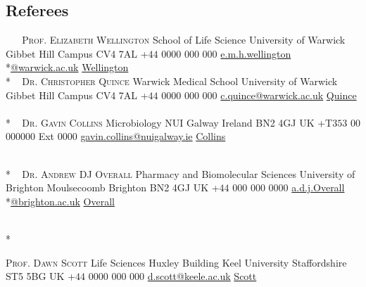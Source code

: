 \documentclass[hidelinks]{james-cv} %
\begin{document}
\begin{aside1}
\color{gray}\headingfontcontact
\section{Referees}
~
~
\normalsize\color{gray}\bodyfontsc\textsc{Prof. Elizabeth Wellington}
\bodyfontcontact\normalsize
School of Life Science
University of Warwick
Gibbet Hill Campus
CV4 7AL
+$44$ $0000$ $000$ $000$ \Phone
\footnotesize\mail\href{mailto:e.m.h.wellington@warwick.ac.uk}{e.m.h.wellington}\\*\href{mailto:e.m.h.wellington@warwick.ac.uk}{@warwick.ac.uk} \Envelope
\color{blue}\href{https://warwick.ac.uk/fac/sci/lifesci/research/wrg/} {Wellington}
~
\\*
~
\color{gray}\normalsize\bodyfontsc\textsc{Dr. Christopher Quince}
\bodyfontcontact\normalsize
Warwick Medical School
University of Warwick
Gibbet Hill Campus
CV4 7AL
+$44$ $0000$ $000$ $000$ \Phone
\footnotesize\mail\href{mailto:c.quince@warwick.ac.uk}{c.quince@warwick.ac.uk} \Envelope 
\color{blue}\href{https://warwick.ac.uk/fac/sci/med/staff/cquince/}{Quince}
~
\\*
~
\color{gray}\normalsize\bodyfontsc\textsc{Dr. Gavin Collins}
\bodyfontcontact\normalsize
Microbiology
NUI Galway
Ireland
BN2 4GJ
UK
+T$353$ $00$ $000000$ Ext $0000$ \Phone
\footnotesize\mail\href{mailto:gavin.collins@nuigalway.ie}{gavin.collins@nuigalway.ie} \Envelope 
\color{blue}\href{https://www.nuigalway.ie/our-research/people/natural-sciences/gavincollins/}{Collins}

~
\\*
~
\color{gray}\normalsize\bodyfontsc\textsc{Dr. Andrew DJ Overall}
\bodyfontcontact\normalsize
Pharmacy and Biomolecular Sciences
University of Brighton
Moulsecoomb
Brighton
BN2 4GJ
UK
+$44$ $000$ $000$ $0000$ \Phone
\footnotesize\mail\href{mailto:A.D.J.Overall@brighton.ac.uk}{a.d.j.Overall}\\*\href{mailto:A.D.J.Overall@brighton.ac.uk}{@brighton.ac.uk} \Envelope
\color{blue}\href{https://research.brighton.ac.uk/en/persons/andrew-overall}{Overall}

~
\\*
~

\color{gray}\bodyfontsc\normalsize\textsc{Prof. Dawn Scott}
\bodyfontcontact\normalsize
Life Sciences
Huxley Building
Keel University
Staffordshire
ST5 5BG
UK
+$44$ $0000$ $000$ $000$ \Phone
\footnotesize\mail\href{mailto:d.scott@keele.ac.uk}{d.scott@keele.ac.uk} \Envelope
\color{blue}\href{https://www.keele.ac.uk/lifesci/ourpeople/dawnscott/}{Scott}

\end{aside1}
\end{document}
